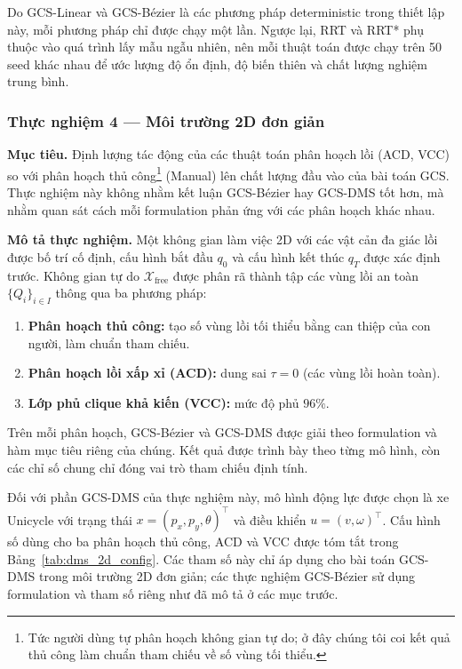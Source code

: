 Do GCS-Linear và GCS-Bézier là các phương pháp deterministic trong thiết lập
này, mỗi phương pháp chỉ được chạy một lần. Ngược lại, RRT và RRT* phụ thuộc vào
quá trình lấy mẫu ngẫu nhiên, nên mỗi thuật toán được chạy trên 50 seed khác
nhau để ước lượng độ ổn định, độ biến thiên và chất lượng nghiệm trung bình.

\subsubsection{Thực nghiệm 4 — Môi trường 2D đơn giản}

\label{subsubsec:scenario_A}

\textbf{Mục tiêu.}
Định lượng tác động của các thuật toán phân hoạch lồi (ACD, VCC) so với phân hoạch thủ công\footnote{Tức người dùng tự phân hoạch không gian tự do; ở đây chúng tôi coi kết quả thủ công làm chuẩn tham chiếu về số vùng tối thiểu.} (Manual) lên chất lượng đầu vào của bài toán GCS. Thực nghiệm này không nhằm kết luận GCS-Bézier hay GCS-DMS tốt hơn, mà nhằm quan sát cách mỗi formulation phản ứng với các phân hoạch khác nhau.

\textbf{Mô tả thực nghiệm.}
Một không gian làm việc 2D với các vật cản đa giác lồi được bố trí cố định, cấu hình bắt đầu $q_{0}$ và cấu hình kết thúc $q_{T}$ được xác định trước. Không gian tự do $\mathcal{X}_{\text{free}}$ được phân rã thành tập các vùng lồi an toàn $\{Q_{i}\}_{i\in I}$ thông qua ba phương pháp:
\begin{enumerate}
    \item \textbf{Phân hoạch thủ công:} tạo số vùng lồi tối thiểu bằng can thiệp của con người, làm chuẩn tham chiếu.
    \item \textbf{Phân hoạch lồi xấp xỉ (ACD):} dung sai $\tau = 0$ (các vùng lồi hoàn toàn).
    \item \textbf{Lớp phủ clique khả kiến (VCC):} mức độ phủ $96\%$.
\end{enumerate}
Trên mỗi phân hoạch, GCS-Bézier và GCS-DMS được giải theo formulation và hàm mục tiêu riêng của chúng. Kết quả được trình bày theo từng mô hình, còn các chỉ số chung chỉ đóng vai trò tham chiếu định tính.

Đối với phần GCS-DMS của thực nghiệm này, mô hình động lực được chọn là xe Unicycle với trạng thái
$x=(p_x,p_y,\theta)^\top$ và điều khiển $u=(v,\omega)^\top$. Cấu hình số dùng cho ba phân hoạch
thủ công, ACD và VCC được tóm tắt trong Bảng~\ref{tab:dms_2d_config}. Các tham số này chỉ áp dụng
cho bài toán GCS-DMS trong môi trường 2D đơn giản; các thực nghiệm GCS-Bézier sử dụng formulation và
tham số riêng như đã mô tả ở các mục trước.

